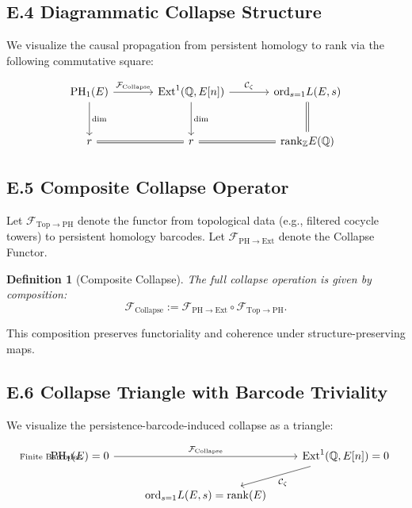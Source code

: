 \documentclass[11pt]{article}
\newtheorem{definition}[theorem]{Definition}
\DeclareMathOperator{\Ext}{Ext}
\DeclareMathOperator{\PH}{PH}
\newcommand{\QQ}{\mathbb{Q}}
\newcommand{\ZZ}{\mathbb{Z}}
\begin{document}
\subsection*{E.4 Diagrammatic Collapse Structure}

We visualize the causal propagation from persistent homology to rank via the following commutative square:

\[
\begin{tikzcd}[row sep=large, column sep=large]
\PH_1(E) \arrow[r, "\mathcal{F}_{\mathrm{Collapse}}"] \arrow[d, "\dim"]
& \Ext^1(\QQ,E[n]) \arrow[d, "\dim"] \arrow[r, "\mathcal{C}_\zeta"]
& \mathrm{ord}_{s=1} L(E,s) \arrow[d, equal] \\
r \arrow[r, equal] & r \arrow[r, equal] & \mathrm{rank}_{\ZZ} E(\QQ)
\end{tikzcd}
\]

\subsection*{E.5 Composite Collapse Operator}

Let $\mathcal{F}_{\mathrm{Top} \to \mathrm{PH}}$ denote the functor from topological data (e.g., filtered cocycle towers) to persistent homology barcodes.  
Let $\mathcal{F}_{\mathrm{PH} \to \mathrm{Ext}}$ denote the Collapse Functor.

\begin{definition}[Composite Collapse]
The full collapse operation is given by composition:
\[
\mathcal{F}_{\mathrm{Collapse}} := \mathcal{F}_{\mathrm{PH} \to \mathrm{Ext}} \circ \mathcal{F}_{\mathrm{Top} \to \mathrm{PH}}.
\]
\end{definition}

This composition preserves functoriality and coherence under structure-preserving maps.

\subsection*{E.6 Collapse Triangle with Barcode Triviality}

We visualize the persistence-barcode-induced collapse as a triangle:

\[
\begin{tikzcd}
\PH_1(E) = 0 \arrow[rr, "\mathcal{F}_{\mathrm{Collapse}}"] \arrow[ "\text{Finite Barcode}"]
& & \Ext^1(\QQ,E[n]) = 0 \arrow[dl, "\mathcal{C}_\zeta"] \\
& \mathrm{ord}_{s=1} L(E,s) = \mathrm{rank}(E) &
\end{tikzcd}
\]
\end{document}
